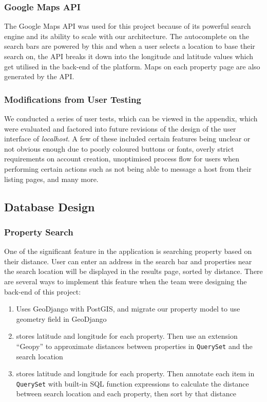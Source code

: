 \subsubsection{Google Maps API}
The Google Maps API was used for this project because of its powerful search
engine and its ability to scale with our architecture. The autocomplete on the
search bars are powered by this and when a user selects a location to base their
search on, the API breaks it down into the longitude and latitude values which
get utilised in the back-end of the platform. Maps on each property page are also
generated by the API.

\subsubsection{Modifications from User Testing}
We conducted a series of user tests, which can be viewed in the appendix, which
were evaluated and factored into future revisions of the design of the user
interface of \emph{localhost}. A few of these included certain features being
unclear or not obvious enough due to poorly coloured buttons or fonts, overly
strict requirements on account creation, unoptimised process flow for users when
performing certain actions such as not being able to message a host from their
listing pages, and many more.

\subsection{Database Design}

\subsubsection{Property Search}
One of the significant feature in the application is searching property based on
their distance. User can enter an address in the search bar and properties
near the search location will be displayed in the results page, sorted by
distance. There are several ways to implement this feature when the team were
designing the back-end of this project:

\begin{enumerate}
  \item Uses GeoDjango with PostGIS, and migrate our property model to use
    geometry field in GeoDjango
  \item stores latitude and longitude for each property. Then use an extension
    ``Geopy'' to approximate distances between properties in \texttt{QuerySet}
    and the search location~\parencite{geopy-doc}
  \item stores latitude and longitude for each property. Then annotate each item
    in \texttt{QuerySet} with built-in SQL function expressions to calculate the
    distance between search location and each property, then sort by that
    distance
\end{enumerate}

